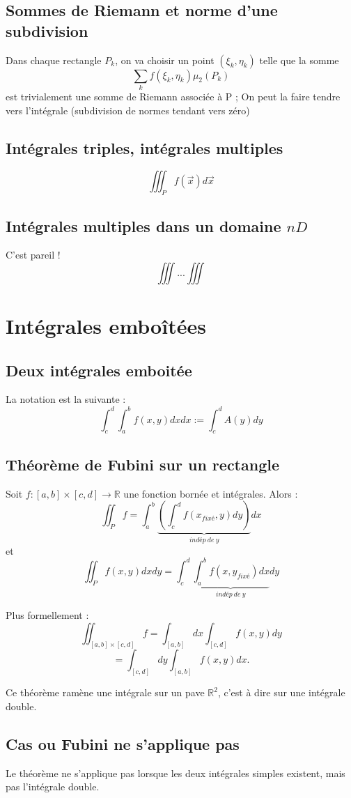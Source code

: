 \documentclass	[11pt, a4paper, openany]{book}
\begin{document}
\subsection{Sommes de Riemann et norme d'une subdivision}
Dans chaque rectangle $P_k$, on va choisir un point $(\xi_k, \eta_k)$ telle que la somme
$$\sum_k f(\xi_k, \eta_k)\mu_2(P_k)$$
est trivialement une somme de Riemann associée à P ; On peut la faire tendre vers l'intégrale (subdivision de normes tendant vers zéro)

\subsection{Intégrales triples, intégrales multiples}
$$\iiint_P f(\vec{x})d\vec{x}$$

\subsection{Intégrales multiples dans un domaine $nD$}
C'est pareil !
$$\iiint...\iiint$$ 

\section{Intégrales emboîtées}
\subsection{Deux intégrales emboitée}
La notation est la suivante : 
$$\int_c^d \int_a^b f(x, y) dx dx := \int_c^d A(y) dy$$

\subsection{Théorème de Fubini sur un rectangle}
Soit $f : [a,b] \times [c,d] \rightarrow \mathbb{R}$ une fonction bornée et intégrales. Alors :
$$\iint_P f = \int_a^b\underbrace{\left(\int_c^d f(x_{fixé}, y) dy\right)}_{indép\ de\ y}dx$$
et
$$\iint_P f(x,y) dxdy = \int_c^d\underbrace{\int_a^b f(x, y_{fixé}) dx}_{indép\ de\ y}dy$$

Plus formellement : 
$$\iint_{[a,b] \times [c,d]} f = \int_{[a,b]} dx \int_{[c,d]} f(x,y) dy$$
$$= \int_{[c,d]} dy \int_{[a,b]} f(x,y) dx.$$

Ce théorème ramène une intégrale sur un pave $\mathbb{R}^2$, c'est à dire sur une intégrale double.

\subsection{Cas ou Fubini ne s'applique pas}
Le théorème ne s'applique pas lorsque les deux intégrales simples existent, mais pas l'intégrale double.\\
\end{document}
